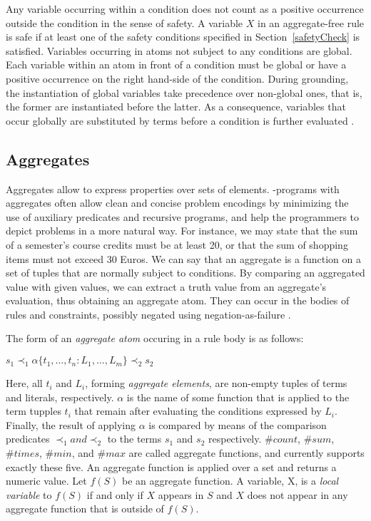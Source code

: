 \documentclass[a4paper, titlepage]{article}
\newcommand\mycenterline[1]{\par\smallskip\centerline{#1} \smallskip}
\begin{document}
Any variable occurring 
within a condition does not count as a positive occurrence 
outside the condition in the sense of safety. A variable 
$X$ in an aggregate-free rule is safe if at least one of 
the safety conditions specified in Section~\ref{safetyCheck} is satisfied.
Variables occurring in atoms not subject to any conditions 
are global. Each variable within an atom in front of a 
condition must be global or have a positive occurrence on 
the right hand-side of the condition. During grounding, the 
instantiation of global variables take precedence over non-global ones, that is, the former are instantiated before 
the latter. As a consequence, variables that occur globally 
are substituted by terms before a condition is further 
evaluated \cite{gkklorst2015}.    

\subsection{Aggregates}
\label{aggregates}
Aggregates allow to express properties over sets of 
elements. \hex{}-programs with aggregates often allow clean 
and concise problem encodings by minimizing the use of 
auxiliary predicates and recursive programs, and help the 
programmers to depict problems in a more natural way. For 
instance, we may state that the sum of a semester's course 
credits must be at least 20, or that the sum of shopping 
items must not exceed 30 Euros. We can say that an 
aggregate is a function on a set of tuples that are 
normally subject to conditions. By comparing an aggregated 
value with given values, we can extract a truth value from 
an aggregate's evaluation, thus obtaining an aggregate 
atom. They can occur in the bodies of rules and constraints, 
possibly negated using negation-as-failure \cite{gkklorst2015}.

The form of an \emph{aggregate atom} occuring in a rule 
body is as follows:\\ \mycenterline{$s_1 \prec_1 \alpha \{ 
 t_1, \dots, t_n : L_1, \dots, L_m\} \prec_2 s_2$} 
Here, all $\mathit{t_i}$ and $\mathit{L_i}$, forming 
\emph{aggregate elements}, are non-empty tuples of terms 
and literals, respectively. $\alpha$ is the name of some 
function that is applied to the term tupples \texttt{$t_i$} 
that remain after evaluating the conditions expressed by 
$L_i$. Finally,  the result of applying $\alpha$ is 
compared by means of the comparison predicates $\prec_1 and 
\prec_2$ to the terms $s_1$ and $s_2$ respectively. 
$\mathit{\#count}$, $\mathit{\#sum}$, $\mathit{\#times}$, 
$\mathit{\#min}$, and $\mathit{\#max}$ are called aggregate 
functions, and \dlvhex{} currently supports exactly these 
five. An aggregate function is applied over a set and 
returns a numeric value. Let $f(S)$ be an aggregate 
function. A variable, X, is a \emph{local variable} to 
$f(S)$ if and only if $X$ appears in $S$ and $X$ does not 
appear in any aggregate function that is outside of $f(S)$.
\end{document}
